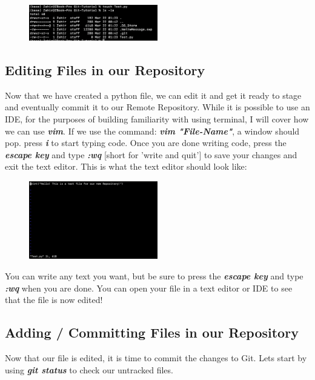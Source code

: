 \documentclass{article}
\begin{document}
\begin{figure}[h]
    \centering
    \includegraphics[width=0.5\textwidth]{MK.png}
\end{figure}

\subsection*{Editing Files in our Repository}

 Now that we have created a python file, we can edit it and get it ready to stage and eventually commit it to our Remote Repository. While it is possible to use an IDE, for the purposes of building familiarity with using terminal, I will cover how we can use \textit{\textbf{vim}}. If we use the command: \textit{\textbf{vim "File-Name"}}, a window should pop. press \textit{\textbf{i}}
to start typing code. Once you are done writing code, press the \textit{\textbf{escape key}} and type \textit{\textbf{:wq}} [short for 'write and quit'] to save your changes and exit the text editor. This is what the text editor should look like:

\vspace{100pt}

\begin{figure}[h]
    \centering
    \includegraphics[width=0.5\textwidth]{vim.png}
\end{figure}

You can write any text you want, but be sure to press the \textit{\textbf{escape key}} and type \textit{\textbf{:wq}} when you are done. You can open your file in a text editor or IDE to see that the file is now edited! 

\subsection*{Adding / Committing Files in our Repository}
Now that our file is edited, it is time to commit the changes to Git. Lets start by using \textit{\textbf{git status}} to check our untracked files.
\end{document}
